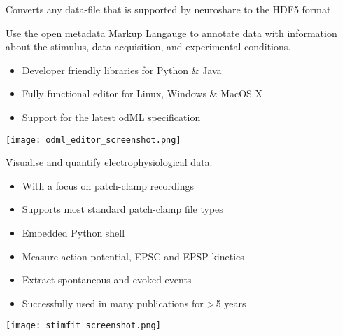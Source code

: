 \begin{multicols}{3}
Converts any data-file that is supported by neuroshare to the HDF5 format.

%


Use the {open metadata Markup Langauge} to annotate data with information about the stimulus, data acquisition, and experimental conditions.

\begin{itemize}[nolistsep,topsep=0em,leftmargin=1pc]
\item Developer friendly libraries for Python \& Java
\item Fully functional editor for Linux, Windows \& MacOS X
\item Support for the latest odML specification
\end{itemize}

\texttt{[image: odml\_editor\_screenshot.png]}

%




Visualise and quantify electrophysiological data.
\begin{itemize}[nolistsep,topsep=0em,leftmargin=1pc]
\item With a focus on patch-clamp recordings
\item Supports most standard patch-clamp file types
\item Embedded Python shell
\item Measure action potential, EPSC and EPSP kinetics
\item Extract spontaneous and evoked events
\item Successfully used in many publications for >\,5 years
\end{itemize}
\texttt{[image: stimfit\_screenshot.png]}


\end{multicols}
